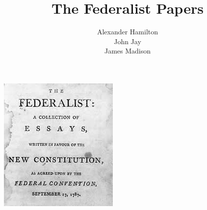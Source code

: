 \documentclass[10pt,letterpaper,pointlessnumbers]{scrbook}
\begin{document}
  
\title{The Federalist Papers}
\author{Alexander Hamilton\\John Jay\\James Madison}
\date{}


\maketitle

\tableofcontents

\mainmatter

\includegraphics{federalist.jpg}





\end{document}

